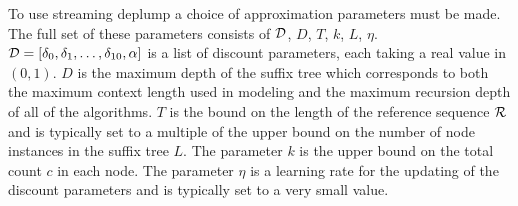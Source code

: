 

To use streaming deplump a choice of approximation  parameters must be made.  The full set of these parameters consists of $\D$, $D$, $T$, $k$, $L$, $\eta$.  $\D = [\dd_0, \dd_1, \ldots, \dd_{10}, \alpha]$ is a list of discount parameters, each taking a real value in $(0,1)$.  $D$ is the maximum depth of the suffix tree which corresponds to both the maximum context length used in modeling and the maximum recursion depth of all of the algorithms.  $T$ is the bound on the length of the reference sequence $\RS$ and is typically set to a multiple of the upper bound on the number of node instances in the suffix tree $L$.  The parameter $k$ is the upper bound on the total count $c$ in each node.  The parameter $\eta$ is a learning rate for the updating of the discount parameters and is typically set to a very small value.  

